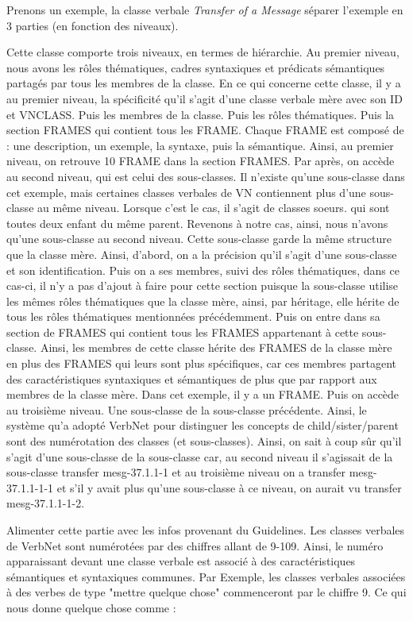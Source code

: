 Prenons un exemple, la classe verbale \emph{Transfer of a Message} séparer l'exemple en 3 parties (en fonction des niveaux).

Cette classe comporte trois niveaux, en termes de hiérarchie. Au premier niveau, nous avons les rôles thématiques, cadres syntaxiques et prédicats sémantiques partagés par tous les membres de la classe. En ce qui concerne cette classe, il y a au premier niveau, la spécificité qu'il s'agit d'une classe verbale mère avec son ID et VNCLASS. Puis les membres de la classe. Puis les rôles thématiques. Puis la section FRAMES qui contient tous les FRAME. Chaque FRAME est composé de : une description, un exemple, la syntaxe, puis la sémantique. Ainsi, au premier niveau, on retrouve 10 FRAME dans la section FRAMES. Par après, on accède au second niveau, qui est celui des sous-classes. Il n'existe qu'une sous-classe dans cet exemple, mais certaines classes verbales de VN contiennent plus d'une sous-classe au même niveau. Lorsque c'est le cas, il s'agit de classes soeurs. qui sont toutes deux enfant du même parent. Revenons à notre cas, ainsi, nous n'avons qu'une sous-classe au second niveau. Cette sous-classe garde la même structure que la classe mère. Ainsi, d'abord, on a la précision qu'il s'agit d'une sous-classe et son identification. Puis on a ses membres, suivi des rôles thématiques, dans ce cas-ci, il n'y a pas d'ajout à faire pour cette section puisque la sous-classe utilise les mêmes rôles thématiques que la classe mère, ainsi, par héritage, elle hérite de tous les rôles thématiques mentionnées précédemment. Puis on entre dans sa section de FRAMES qui contient tous les FRAMES appartenant à cette sous-classe. Ainsi, les membres de cette classe hérite des FRAMES de la classe mère en plus des FRAMES qui leurs sont plus spécifiques, car ces membres partagent des caractéristiques syntaxiques et sémantiques de plus que par rapport aux membres de la classe mère. Dans cet exemple, il y a un FRAME. Puis on accède au troisième niveau. Une sous-classe de la sous-classe précédente. Ainsi, le système qu'a adopté VerbNet pour distinguer les concepts de child/sister/parent sont des numérotation des classes (et sous-classes). Ainsi, on sait à coup sûr qu'il s'agit d'une sous-classe de la sous-classe car, au second niveau il s'agissait de la sous-classe transfer mesg-37.1.1-1 et au troisième niveau on a transfer mesg-37.1.1-1-1 et s'il y avait plus qu'une sous-classe à ce niveau, on aurait vu transfer mesg-37.1.1-1-2.

Alimenter cette partie avec les infos provenant du Guidelines. Les classes verbales de VerbNet sont numérotées par des chiffres allant de 9-109. Ainsi, le numéro apparaissant devant une classe verbale est associé à des caractéristiques sémantiques et syntaxiques communes. Par Exemple, les classes verbales associées à des verbes de type "mettre quelque chose" commenceront par le chiffre 9. Ce qui nous donne quelque chose comme : 

